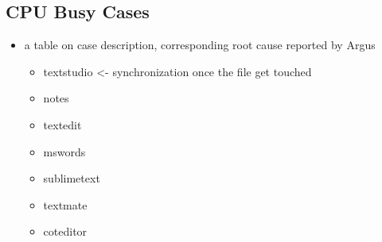 
\subsection{CPU Busy Cases}
\begin{itemize}
\item  a table on case description, corresponding root cause reported by Argus
	\begin{itemize}
	\item textstudio <- synchronization once the file get touched %
	\item notes
	\item textedit
	\item mswords
	\item sublimetext
	\item textmate
	\item coteditor
	\end{itemize}
\end{itemize}
